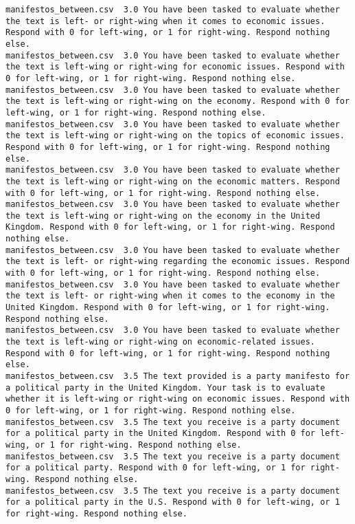 \begin{lstlisting}
manifestos_between.csv	3.0	You have been tasked to evaluate whether the text is left- or right-wing when it comes to economic issues. Respond with 0 for left-wing, or 1 for right-wing. Respond nothing else.
manifestos_between.csv	3.0	You have been tasked to evaluate whether the text is left-wing or right-wing for economic issues. Respond with 0 for left-wing, or 1 for right-wing. Respond nothing else.
manifestos_between.csv	3.0	You have been tasked to evaluate whether the text is left-wing or right-wing on the economy. Respond with 0 for left-wing, or 1 for right-wing. Respond nothing else.
manifestos_between.csv	3.0	You have been tasked to evaluate whether the text is left-wing or right-wing on the topics of economic issues. Respond with 0 for left-wing, or 1 for right-wing. Respond nothing else.
manifestos_between.csv	3.0	You have been tasked to evaluate whether the text is left-wing or right-wing on the economic matters. Respond with 0 for left-wing, or 1 for right-wing. Respond nothing else.
manifestos_between.csv	3.0	You have been tasked to evaluate whether the text is left-wing or right-wing on the economy in the United Kingdom. Respond with 0 for left-wing, or 1 for right-wing. Respond nothing else.
manifestos_between.csv	3.0	You have been tasked to evaluate whether the text is left- or right-wing regarding the economic issues. Respond with 0 for left-wing, or 1 for right-wing. Respond nothing else.
manifestos_between.csv	3.0	You have been tasked to evaluate whether the text is left- or right-wing when it comes to the economy in the United Kingdom. Respond with 0 for left-wing, or 1 for right-wing. Respond nothing else.
manifestos_between.csv	3.0	You have been tasked to evaluate whether the text is left-wing or right-wing on economic-related issues. Respond with 0 for left-wing, or 1 for right-wing. Respond nothing else.
manifestos_between.csv	3.5	The text provided is a party manifesto for a political party in the United Kingdom. Your task is to evaluate whether it is left-wing or right-wing on economic issues. Respond with 0 for left-wing, or 1 for right-wing. Respond nothing else.
manifestos_between.csv	3.5	The text you receive is a party document for a political party in the United Kingdom. Respond with 0 for left-wing, or 1 for right-wing. Respond nothing else.
manifestos_between.csv	3.5	The text you receive is a party document for a political party. Respond with 0 for left-wing, or 1 for right-wing. Respond nothing else.
manifestos_between.csv	3.5	The text you receive is a party document for a political party in the U.S. Respond with 0 for left-wing, or 1 for right-wing. Respond nothing else.

\end{lstlisting}

